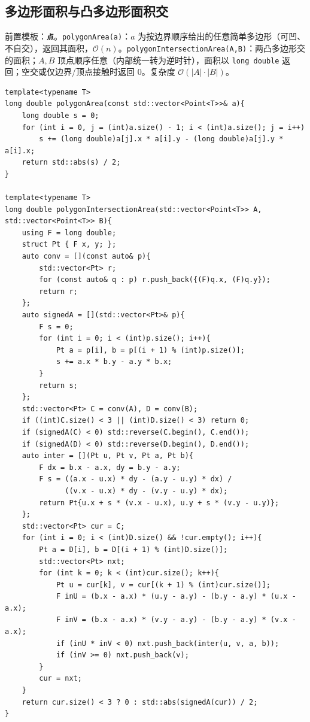 \subsection{多边形面积与凸多边形面积交}

前置模板：\textbf{\texttt{点}}。\verb|polygonArea(a)|：$a$ 为按边界顺序给出的任意简单多边形（可凹、不自交），返回其面积，$\mathcal{O}(n)$。\verb|polygonIntersectionArea(A,B)|：两凸多边形交的面积；$A,B$ 顶点顺序任意（内部统一转为逆时针），面积以 \texttt{long double} 返回；空交或仅边界/顶点接触时返回 $0$。复杂度 $\mathcal{O}(|A|\cdot|B|)$。

\begin{lstlisting}
template<typename T>
long double polygonArea(const std::vector<Point<T>>& a){
    long double s = 0;
    for (int i = 0, j = (int)a.size() - 1; i < (int)a.size(); j = i++)
        s += (long double)a[j].x * a[i].y - (long double)a[j].y * a[i].x;
    return std::abs(s) / 2;
}

template<typename T>
long double polygonIntersectionArea(std::vector<Point<T>> A, std::vector<Point<T>> B){
    using F = long double;
    struct Pt { F x, y; };
    auto conv = [](const auto& p){
        std::vector<Pt> r;
        for (const auto& q : p) r.push_back({(F)q.x, (F)q.y});
        return r;
    };
    auto signedA = [](std::vector<Pt>& p){
        F s = 0;
        for (int i = 0; i < (int)p.size(); i++){
            Pt a = p[i], b = p[(i + 1) % (int)p.size()];
            s += a.x * b.y - a.y * b.x;
        }
        return s;
    };
    std::vector<Pt> C = conv(A), D = conv(B);
    if ((int)C.size() < 3 || (int)D.size() < 3) return 0;
    if (signedA(C) < 0) std::reverse(C.begin(), C.end());
    if (signedA(D) < 0) std::reverse(D.begin(), D.end());
    auto inter = [](Pt u, Pt v, Pt a, Pt b){
        F dx = b.x - a.x, dy = b.y - a.y;
        F s = ((a.x - u.x) * dy - (a.y - u.y) * dx) /
              ((v.x - u.x) * dy - (v.y - u.y) * dx);
        return Pt{u.x + s * (v.x - u.x), u.y + s * (v.y - u.y)};
    };
    std::vector<Pt> cur = C;
    for (int i = 0; i < (int)D.size() && !cur.empty(); i++){
        Pt a = D[i], b = D[(i + 1) % (int)D.size()];
        std::vector<Pt> nxt;
        for (int k = 0; k < (int)cur.size(); k++){
            Pt u = cur[k], v = cur[(k + 1) % (int)cur.size()];
            F inU = (b.x - a.x) * (u.y - a.y) - (b.y - a.y) * (u.x - a.x);
            F inV = (b.x - a.x) * (v.y - a.y) - (b.y - a.y) * (v.x - a.x);
            if (inU * inV < 0) nxt.push_back(inter(u, v, a, b));
            if (inV >= 0) nxt.push_back(v);
        }
        cur = nxt;
    }
    return cur.size() < 3 ? 0 : std::abs(signedA(cur)) / 2;
}
\end{lstlisting}
